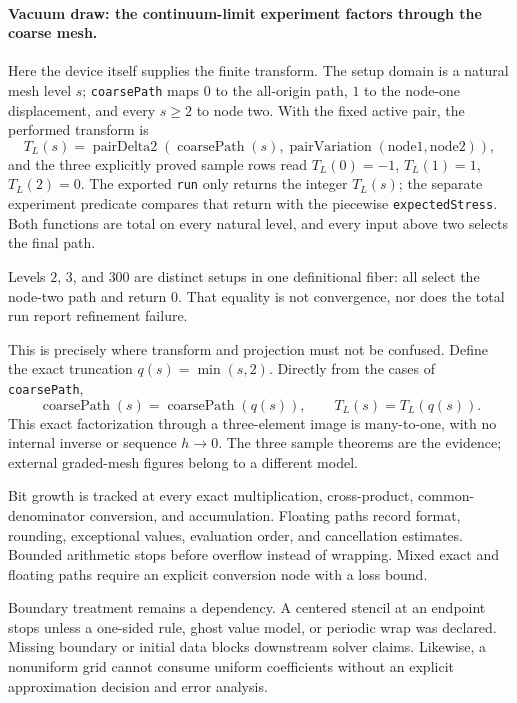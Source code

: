 \paragraph{Vacuum draw: the continuum-limit experiment factors through the coarse mesh.}
Here the device itself supplies the finite transform.  The setup domain is a natural mesh level \(s\); \texttt{coarsePath}
maps \(0\) to the all-origin path, \(1\) to the node-one displacement, and every \(s\ge2\) to node two.  With the
fixed active pair, the performed transform is
\[
 T_L(s)=\operatorname{pairDelta2}(\operatorname{coarsePath}(s),
                                  \operatorname{pairVariation}(\mathrm{node1},\mathrm{node2})),
\]
and the three explicitly proved sample rows read \(T_L(0)=-1\), \(T_L(1)=1\), \(T_L(2)=0\).  The exported \texttt{run}
only returns the integer \(T_L(s)\); the separate experiment predicate compares that return with the piecewise
\texttt{expectedStress}.  Both functions are total on every natural level, and every input above two selects the final
path.

Levels \(2\), \(3\), and \(300\) are distinct setups in one definitional fiber: all select the node-two path and
return \(0\).  That equality is not convergence, nor does the total run report refinement failure.

This is precisely where transform and projection must not be confused.  Define the exact truncation
\(q(s)=\min(s,2)\).  Directly from the cases of \texttt{coarsePath},
\[
             \operatorname{coarsePath}(s)=\operatorname{coarsePath}(q(s)),
             \qquad T_L(s)=T_L(q(s)).
\]
This exact factorization through a three-element image is many-to-one, with no internal inverse or sequence
\(h\to0\).  The three sample theorems are the evidence; external graded-mesh figures belong to a different model.

Bit growth is tracked at every exact multiplication, cross-product, common-denominator conversion, and accumulation.
Floating paths record format, rounding, exceptional values, evaluation order, and cancellation estimates.  Bounded
arithmetic stops before overflow instead of wrapping.  Mixed exact and floating paths require an explicit conversion
node with a loss bound.

Boundary treatment remains a dependency.  A centered stencil at an endpoint stops unless a one-sided rule, ghost
value model, or periodic wrap was declared.  Missing boundary or initial data blocks downstream solver claims.
Likewise, a nonuniform grid cannot consume uniform coefficients without an explicit approximation decision and error
analysis.


